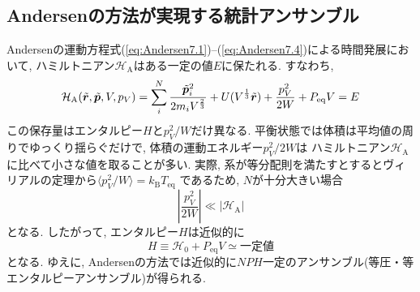 \subsection{Andersenの方法が実現する統計アンサンブル}
Andersenの運動方程式(\ref{eq:Andersen7.1})--(\ref{eq:Andersen7.4})による時間発展において,
ハミルトニアン$\mathcal{H}_{\mathrm{A}}$はある一定の値$E$に保たれる. 
すなわち, 
\begin{equation}
 \mathcal{H}_{\mathrm{A}}
 (\Tilde{\bm{r}}, \Tilde{\bm{p}}, V, p_{V})
  =
 \sum_{i}^{N} \frac{\Tilde{\bm{p}}_{i}^{2}}{2 m_{i} V^{\frac{2}{3}}}
 + U(V^{\frac{1}{3}} \Tilde{\bm{r}})
 + \frac{p_{V}^2}{2W} + P_{\mathrm{eq}}V
 =
 E
 \label{eq:Andersen12}
\end{equation}
この保存量はエンタルピー$H$と$p_{V}^{2}/W$だけ異なる.
平衡状態では体積は平均値の周りでゆっくり揺らぐだけで, 体積の運動エネルギー$p_{V}^{2}/2W$は
ハミルトニアン$\mathcal{H}_{\mathrm{A}}$に比べて小さな値を取ることが多い.
実際, 系が等分配則を満たすとするとヴィリアルの定理から$\langle p_{V}^{2}/W \rangle = k_{\mathrm{B}}T_{\mathrm{eq}}$
であるため, $N$が十分大きい場合
\begin{equation}
 \left| \frac{p_{V}^{2}}{2 W} \right| \ll \left| \mathcal{H}_{\mathrm{A}} \right|
 \label{eq:Andersen13}
\end{equation}
となる. したがって, エンタルピー$H$は近似的に
\begin{equation}
 H
  \equiv
  \mathcal{H}_{0} + P_{\mathrm{eq}} V
  \simeq
  \mathrm{一定値}
  \label{eq:Andersen14}
\end{equation}
となる. ゆえに, Andersenの方法では近似的に$NPH$一定のアンサンブル(等圧・等エンタルピーアンサンブル)が得られる. 
